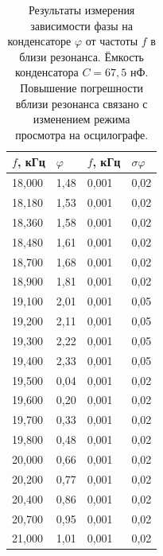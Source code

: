 \documentclass[12pt]{article}
\begin{document}
\begin{table}[H]
    \centering
    \begin{tabular}{|l|l|l|l|}
        \hline
        $f$, кГц & $\varphi$ & $f$, кГц & $\sigma \varphi$ \\ \hline
        18,000   & 1,48      & 0,001    & 0,02             \\ \hline
        18,180   & 1,53      & 0,001    & 0,02             \\ \hline
        18,360   & 1,58      & 0,001    & 0,02             \\ \hline
        18,480   & 1,61      & 0,001    & 0,02             \\ \hline
        18,700   & 1,68      & 0,001    & 0,02             \\ \hline
        18,900   & 1,81      & 0,001    & 0,02             \\ \hline
        19,100   & 2,01      & 0,001    & 0,05             \\ \hline
        19,200   & 2,11      & 0,001    & 0,05             \\ \hline
        19,300   & 2,22      & 0,001    & 0,05             \\ \hline
        19,400   & 2,33      & 0,001    & 0,05             \\ \hline
        19,500   & 0,04      & 0,001    & 0,02             \\ \hline
        19,600   & 0,20      & 0,001    & 0,02             \\ \hline
        19,700   & 0,33      & 0,001    & 0,02             \\ \hline
        19,800   & 0,48      & 0,001    & 0,02             \\ \hline
        20,000   & 0,66      & 0,001    & 0,02             \\ \hline
        20,200   & 0,77      & 0,001    & 0,02             \\ \hline
        20,400   & 0,86      & 0,001    & 0,02             \\ \hline
        20,700   & 0,95      & 0,001    & 0,02             \\ \hline
        21,000   & 1,01      & 0,001    & 0,02             \\ \hline
    \end{tabular}
    \caption{Результаты измерения зависимости фазы на конденсаторе $\varphi$ от частоты $f$ в близи резонанса.
        Ёмкость конденсатора $C = 67,5$ нФ. Повышение погрешности вблизи резонанса связано с изменением режима
        просмотра на осцилографе.}
    \label{tab:5}
\end{table}
\end{document}

